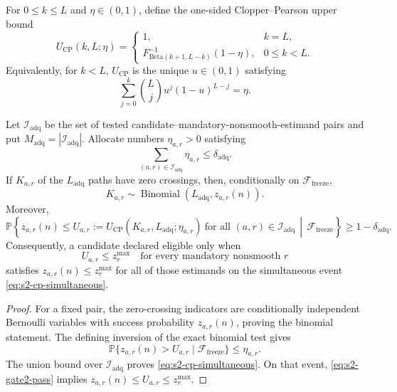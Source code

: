 For \(0\leq k\leq L\) and \(\eta\in(0,1)\), define the one-sided
Clopper--Pearson upper bound
\begin{equation}
 U_{\mathrm{CP}}(k,L;\eta)
 =
 \begin{cases}
  1, & k=L,\\[2mm]
  F_{\mathrm{Beta}(k+1,L-k)}^{-1}(1-\eta), & 0\leq k<L.
 \end{cases}
 \label{eq:s2-cp}
\end{equation}
Equivalently, for \(k<L\), \(U_{\mathrm{CP}}\) is the unique \(u\in(0,1)\)
satisfying
\[
 \sum_{j=0}^{k}\binom{L}{j}u^j(1-u)^{L-j}=\eta.
\]

\begin{theorem}
\label{thm:s2-gate2}
Let \(\mathcal I_{\mathrm{adq}}\) be the set of tested
candidate--mandatory-nonsmooth-estimand pairs and put
\(M_{\mathrm{adq}}=|\mathcal I_{\mathrm{adq}}|\).  Allocate numbers
\(\eta_{a,r}>0\) satisfying
\[
 \sum_{(a,r)\in\mathcal I_{\mathrm{adq}}}\eta_{a,r}
 \leq\delta_{\mathrm{adq}}.
\]
If \(K_{a,r}\) of the \(L_{\mathrm{adq}}\) paths have zero crossings, then,
conditionally on \(\mathcal F_{\mathrm{freeze}}\),
\[
 K_{a,r}\sim
 \operatorname{Binomial}(L_{\mathrm{adq}},z_{a,r}(n)).
\]
Moreover,
\begin{equation}
 \mathbb P\left\{
  z_{a,r}(n)
  \leq
  U_{a,r}:=
  U_{\mathrm{CP}}(K_{a,r},L_{\mathrm{adq}};\eta_{a,r})
  \ \text{for all }(a,r)\in\mathcal I_{\mathrm{adq}}
  \,\middle|\,\mathcal F_{\mathrm{freeze}}
 \right\}
 \geq1-\delta_{\mathrm{adq}}.
 \label{eq:s2-cp-simultaneous}
\end{equation}
Consequently, a candidate declared eligible only when
\begin{equation}
 U_{a,r}\leq z_r^{\max}
 \quad
 \text{for every mandatory nonsmooth \(r\)}
 \label{eq:s2-gate2-pass}
\end{equation}
satisfies \(z_{a,r}(n)\leq z_r^{\max}\) for all of those estimands on the
simultaneous event \eqref{eq:s2-cp-simultaneous}.
\end{theorem}

\begin{proof}
For a fixed pair, the zero-crossing indicators are conditionally independent
Bernoulli variables with success probability \(z_{a,r}(n)\), proving the
binomial statement.  The defining inversion of the exact binomial test gives
\[
 \mathbb P\{z_{a,r}(n)>U_{a,r}
 \mid\mathcal F_{\mathrm{freeze}}\}
 \leq\eta_{a,r}.
\]
The union bound over \(\mathcal I_{\mathrm{adq}}\) proves
\eqref{eq:s2-cp-simultaneous}.  On that event,
\eqref{eq:s2-gate2-pass} implies
\(z_{a,r}(n)\leq U_{a,r}\leq z_r^{\max}\).
\end{proof}

